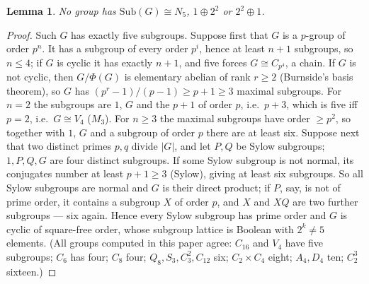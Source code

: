 \documentclass[11pt]{amsart}
\newtheorem{lem}[thm]{Lemma}
\theoremstyle{definition}
\newcommand{\Sub}{\mathrm{Sub}}
\begin{document}
\begin{lem}\label{lem:five}
No group has $\Sub(G)\cong N_5$, $1\oplus2^2$ or $2^2\oplus1$.
\end{lem}
\begin{proof}
Such $G$ has exactly five subgroups. Suppose first that $G$ is a $p$-group of
order $p^n$. It has a subgroup of every order $p^i$, hence at least $n{+}1$
subgroups, so $n\le4$; if $G$ is cyclic it has exactly $n{+}1$, and five forces
$G\cong C_{p^4}$, a chain. If $G$ is not cyclic, then $G/\Phi(G)$ is elementary
abelian of rank $r\ge2$ (Burnside's basis theorem), so $G$ has
$(p^r-1)/(p-1)\ge p{+}1\ge3$ maximal subgroups. For $n=2$ the subgroups are $1$,
$G$ and the $p{+}1$ of order $p$, i.e.\ $p{+}3$, which is five iff $p=2$, i.e.\
$G\cong V_4$ ($M_3$). For $n\ge3$ the maximal subgroups have order $\ge p^2$, so
together with $1$, $G$ and a subgroup of order $p$ there are at least six.
Suppose next that two distinct primes $p,q$ divide $|G|$, and let $P,Q$ be
Sylow subgroups; $1,P,Q,G$ are four distinct subgroups. If some Sylow subgroup
is not normal, its conjugates number at least $p{+}1\ge3$ (Sylow), giving at
least six subgroups. So all Sylow subgroups are normal and $G$ is their direct
product; if $P$, say, is not of prime order, it contains a subgroup $X$ of
order $p$, and $X$ and $XQ$ are two further subgroups --- six again. Hence
every Sylow subgroup has prime order and $G$ is cyclic of square-free order,
whose subgroup lattice is Boolean with $2^k\ne5$ elements. (All groups computed
in this paper agree: $C_{16}$ and $V_4$ have five subgroups; $C_6$ has four;
$C_8$ four; $Q_8,S_3,C_3^2,C_{12}$ six; $C_2\times C_4$ eight; $A_4,D_4$ ten;
$C_2^3$ sixteen.)
\end{proof}
\end{document}
